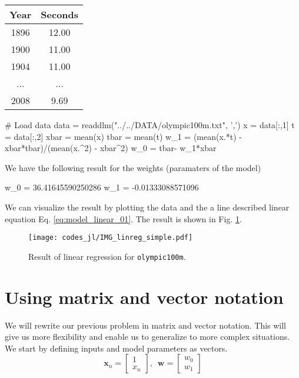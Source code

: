 \documentclass[a4paper,11pt]{article} %
\newcommand{\txtinline}[1]{\texttt{#1}}
\begin{document}
\begin{table}[H]
\begin{center}
\begin{tabular}{|c|c|}
\hline
Year & Seconds \\
\hline
1896 & 12.00 \\
1900 & 11.00 \\
1904 & 11.00 \\
...  & ...   \\
2008 & 9.69  \\
\hline
\end{tabular}
\end{center}
\end{table}


\begin{juliacode}
# Load data
data = readdlm("../../DATA/olympic100m.txt", ',')
x = data[:,1]
t = data[:,2]
xbar = mean(x)
tbar = mean(t)
w_1 = (mean(x.*t) - xbar*tbar)/(mean(x.^2) - xbar^2)
w_0 = tbar- w_1*xbar
\end{juliacode}

We have the following result for the weights (paramaters of the model)
\begin{textcode}
w_0 = 36.41645590250286
w_1 = -0.01333088571096
\end{textcode}

We can visualize the result by plotting the data and the a line described
linear equation Eq. \eqref{eq:model_linear_01}. The result is shown in
Fig. \ref{fig:linreg_01}.
\begin{figure}[H]
\begin{center}
\texttt{[image: codes\_jl/IMG\_linreg\_simple.pdf]}
\end{center}
\caption{Result of linear regression for \txtinline{olympic100m}.}
\label{fig:linreg_01}
\end{figure}


\section{Using matrix and vector notation}

We will rewrite our previous problem in matrix and vector notation. This will
give us more flexibility and enable us to generalize to more complex situations.
We start by defining inputs and model parameters as vectors.
\begin{equation*}
\mathbf{x}_{n} = \begin{bmatrix}
1 \\
x_{n}
\end{bmatrix}
,\,\,\,%
\mathbf{w} = \begin{bmatrix}
w_{0} \\
w_{1}
\end{bmatrix}
\end{equation*}
\end{document}

